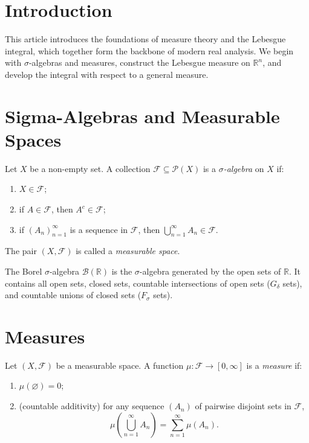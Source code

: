 \documentclass[11pt]{article}
\begin{document}
\maketitle

\section*{Introduction}

This article introduces the foundations of measure theory and the Lebesgue integral, which together form the backbone of modern real analysis. We begin with $\sigma$-algebras and measures, construct the Lebesgue measure on $\mathbb{R}^n$, and develop the integral with respect to a general measure.

\section{Sigma-Algebras and Measurable Spaces}

\begin{definition}
Let $X$ be a non-empty set. A collection $\mathcal{F} \subseteq \mathcal{P}(X)$ is a \emph{$\sigma$-algebra} on $X$ if:
\begin{enumerate}
  \item $X \in \mathcal{F}$;
  \item if $A \in \mathcal{F}$, then $A^c \in \mathcal{F}$;
  \item if $(A_n)_{n=1}^\infty$ is a sequence in $\mathcal{F}$, then $\bigcup_{n=1}^\infty A_n \in \mathcal{F}$.
\end{enumerate}
The pair $(X, \mathcal{F})$ is called a \emph{measurable space}.
\end{definition}

\begin{example}
The Borel $\sigma$-algebra $\mathcal{B}(\mathbb{R})$ is the $\sigma$-algebra generated by the open sets of $\mathbb{R}$. It contains all open sets, closed sets, countable intersections of open sets ($G_\delta$ sets), and countable unions of closed sets ($F_\sigma$ sets).
\end{example}

\section{Measures}

\begin{definition}[Measure]
Let $(X, \mathcal{F})$ be a measurable space. A function $\mu \colon \mathcal{F} \to [0, \infty]$ is a \emph{measure} if:
\begin{enumerate}
  \item $\mu(\varnothing) = 0$;
  \item (countable additivity) for any sequence $(A_n)$ of pairwise disjoint sets in $\mathcal{F}$,
  \[
    \mu\!\left(\bigcup_{n=1}^\infty A_n\right) = \sum_{n=1}^\infty \mu(A_n).
  \]
\end{enumerate}
\end{definition}
\end{document}
